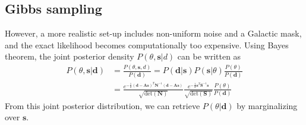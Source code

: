 \documentclass[twocolumn]{../common/aa}
\begin{document}
\subsection{Gibbs sampling}
\label{sec:gibbs}

However, a more realistic set-up includes non-uniform noise and a Galactic mask, and the exact likelihood becomes computationally too expensive. Using Bayes theorem, the joint posterior density $P(\theta, \textbf{s} | d)$ can be written as
\begin{align}
    \nonumber
    P(\theta, \textbf{s} | \textbf{d}) &= \frac{P(\theta, \textbf{s}, d)}{P(\textbf{d})} = P(\textbf{d} | \textbf{s})P(\textbf{s}| \theta)\frac{P(\theta)}{P(\textbf{d})}\\
    \label{eq:joint-posterior}
    &= \frac{e^{-\frac12 \left(\textbf{d}-\textbf{A}\textbf{s} \right)^T \mathbf{N}^{-1}\left(\textbf{d}-\textbf{A}\textbf{s} \right)}}{\sqrt{\mathrm{det}\left(\mathbf{N}\right)}}
    \frac{e^{-\frac12 \textbf{s}^T \mathbf{S}^{-1}\textbf{s}}}{\sqrt{\mathrm{det}\left(\mathbf{S}\right)}}\frac{P(\theta)}{P(\mathbf{d})}
\end{align}
From this joint posterior distribution, we can retrieve $P(\theta | \mathbf{d})$ by marginalizing over $\mathbf{s}$.
\end{document}
